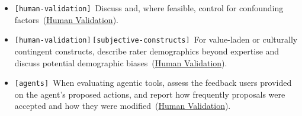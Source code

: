 \documentclass[smallextended]{svjour3}
\makeatletter
\newcommand{\should}{\textbf{should}\xspace}
\newcommand{\iconS}{\usebox{\iconSbox}\xspace}
\newcommand{\iconS}{○\xspace}
\newcommand{\condition}[1]{\texttt{\small[#1]}\,}
\newcommand{\condition}[1]{@@cond:#1@@}
\newcommand{\refhumanvalidation}{\hyperref[sec:use-human-validation-for-llm-outputs]{Human Validation}}
\newcommand{\refhumanvalidation}{\href{/guidelines/human-validation/}{Human Validation}}
\makeatother
\begin{document}
\begin{appendices}
\begin{itemize}[label={},leftmargin=*]
    \item \iconS \condition{human-validation} Discuss and, where feasible, control for confounding factors~(\refhumanvalidation).
    \item \iconS \condition{human-validation}\condition{subjective-constructs} For value-laden or culturally contingent constructs, describe rater demographics beyond expertise and discuss potential demographic biases~(\refhumanvalidation).
    \item \iconS \condition{agents} When evaluating agentic tools, assess the feedback users provided on the agent's proposed actions, and report how frequently proposals were accepted and how they were modified~(\refhumanvalidation).
\end{itemize}


\end{appendices}
\end{document}
